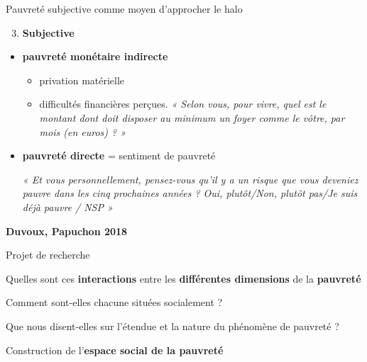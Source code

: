 \documentclass[10pt,xcolor=table,color={dvipsnames,usenames},ignorenonframetext,usepdftitle=false,french]{beamer}
\providecommand{\tightlist}{%
  \setlength{\parskip}{0pt}
  }
\begin{document}
\begin{frame}{Pauvreté subjective comme moyen d'approcher le halo}
\protect\hypertarget{pauvretuxe9-subjective-comme-moyen-dapprocher-le-halo}{}
\begin{enumerate}
\setcounter{enumi}{2}
\tightlist
\item
  \textbf{Subjective}
\end{enumerate}

\begin{itemize}
\item
  \textbf{pauvreté monétaire indirecte}

  \begin{itemize}
  \item
    privation matérielle
  \item
    difficultés financières perçues. \footnotesize  \emph{« Selon vous,
    pour vivre, quel est le montant dont doit disposer au minimum un
    foyer comme le vôtre, par mois (en euros) ? »} \normalsize
  \end{itemize}
\end{itemize}

\pause

\bigskip

\bigskip

\begin{itemize}
\item
  \textbf{pauvreté directe} = sentiment de pauvreté

  \footnotesize

  \emph{« Et vous personnellement, pensez-vous qu'il y a un risque que
  vous deveniez pauvre dans les cinq prochaines années ? Oui,
  plutôt/Non, plutôt pas/Je suis déjà pauvre / NSP »} \normalsize
\end{itemize}

\faArrowCircleRight{} \textbf{Duvoux, Papuchon 2018}
\end{frame}

\begin{frame}{Projet de recherche}
\protect\hypertarget{projet-de-recherche}{}
\begin{encadre}

\bigskip

Quelles sont ces \textbf{interactions} entre les \textbf{différentes
dimensions} de la \textbf{pauvreté}

\begin{center}
\Huge \faQuestion \normalsize
\end{center}

\end{encadre}

Comment sont-elles chacune situées socialement ?

Que nous disent-elles sur l'étendue et la nature du phénomène de
pauvreté ?

\bigskip

\faArrowCircleRight{} Construction de l'\textbf{espace social de la
pauvreté}
\end{frame}
\end{document}
